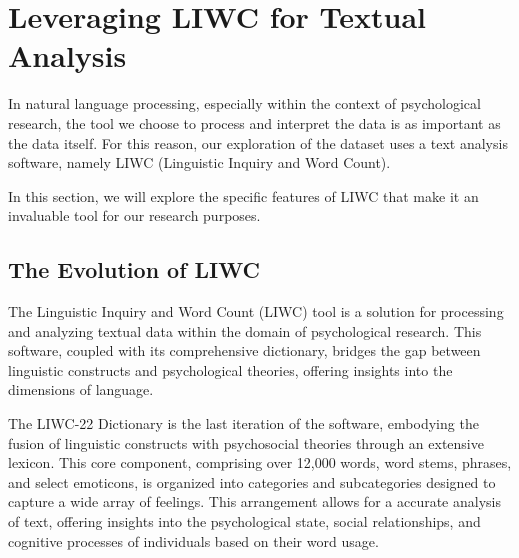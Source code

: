 \section{Leveraging LIWC for Textual Analysis}

\quad In natural language processing, especially within the context of psychological research, the tool we choose to process and interpret the data is as important as the data itself. For this reason, our exploration of the dataset uses a text analysis software, namely LIWC (Linguistic Inquiry and Word Count).



In this section, we will explore the specific features of LIWC that make it an invaluable tool for our research purposes. 


\subsection{The Evolution of LIWC}

\quad The Linguistic Inquiry and Word Count (LIWC) tool is a solution for processing and analyzing textual data within the domain of psychological research. This software, coupled with its comprehensive dictionary, bridges the gap between linguistic constructs and psychological theories, offering insights into the dimensions of language.

\quad The LIWC-22 Dictionary is the last iteration of the software, embodying the fusion of linguistic constructs with psychosocial theories through an extensive lexicon. This core component, comprising over 12,000 words, word stems, phrases, and select emoticons, is organized into categories and subcategories designed to capture a wide array of feelings. This arrangement allows for a accurate analysis of text, offering insights into the psychological state, social relationships, and cognitive processes of individuals based on their word usage.


